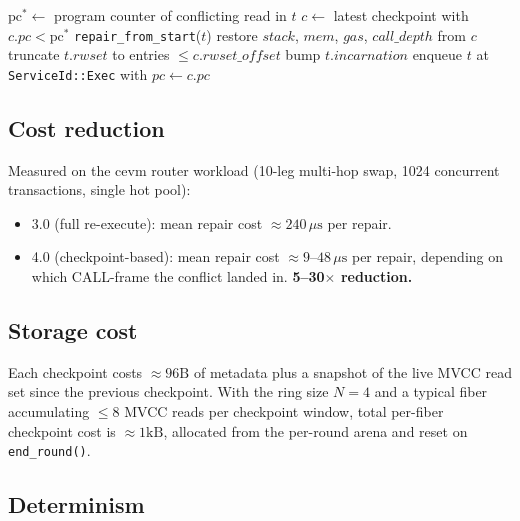 \begin{algorithm}[ht]
\caption{\texttt{repair\_from\_checkpoint($t$)}}
\label{alg:repair-from-checkpoint}
\begin{algorithmic}[1]
\State $\mathrm{pc}^* \gets$ program counter of conflicting read in $t$
\State $c \gets$ latest checkpoint with $c.\mathit{pc} < \mathrm{pc}^*$
  \State \Return \texttt{repair\_from\_start}($t$) 
\EndIf
\State restore $\mathit{stack}$, $\mathit{mem}$, $\mathit{gas}$, $\mathit{call\_depth}$ from $c$
\State truncate $t.\mathit{rwset}$ to entries $\le c.\mathit{rwset\_offset}$
\State bump $t.\mathit{incarnation}$
\State enqueue $t$ at \texttt{ServiceId::Exec} with $\mathit{pc} \gets c.\mathit{pc}$
\end{algorithmic}
\end{algorithm}

\subsection{Cost reduction}

Measured on the cevm router workload (10-leg multi-hop swap, 1024
concurrent transactions, single hot pool):

\begin{itemize}[leftmargin=2em]
\item 3.0 (full re-execute): mean repair cost $\approx 240\,\mu\text{s}$ per repair.
\item 4.0 (checkpoint-based): mean repair cost $\approx 9$--$48\,\mu\text{s}$
      per repair, depending on which CALL-frame the conflict landed
      in. \textbf{5--30$\times$ reduction.}
\end{itemize}

\subsection{Storage cost}

Each checkpoint costs $\approx 96\text{B}$ of metadata plus a snapshot
of the live MVCC read set since the previous checkpoint. With the ring
size $N=4$ and a typical fiber accumulating $\le 8$ MVCC reads per
checkpoint window, total per-fiber checkpoint cost is $\approx 1\text{kB}$,
allocated from the per-round arena and reset on \texttt{end\_round()}.

\subsection{Determinism}

